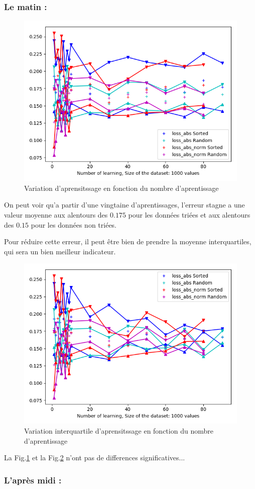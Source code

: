 \subsubsection*{Le matin :}

\begin{figure}[H]
    \center
    \includegraphics[height=\moyen]{sources/data/etfn/graph2.png}
	\caption{Variation d'aprensitssage en fonction du nombre d'aprentissage}
	\label{etfn2}
\end{figure}

On peut voir qu'a partir d'une vingtaine d'aprentissages, l'erreur stagne a une valeur moyenne
aux alentours des $0.175$ pour les données triées et
aux alentours des $0.15$ pour les données non triées.


Pour réduire cette erreur, il peut être bien de prendre la moyenne interquartiles, qui sera un bien meilleur indicateur.

\begin{figure}[H]
    \center
    \includegraphics[height=\moyen]{sources/data/etfn/graph3.png}
	\caption{Variation interquartile d'aprensitssage en fonction du nombre d'aprentissage}
	\label{etfn3}
\end{figure}
La Fig.\ref{etfn2} et la Fig.\ref{etfn3} n'ont pas de differences significatives...

\subsubsection*{L'après midi :}
